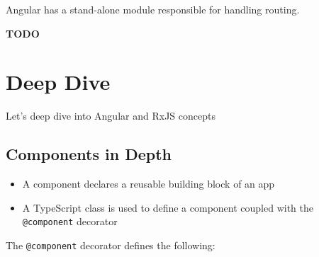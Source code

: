 \documentclass[12pt,]{article}
\providecommand{\tightlist}{%
  \setlength{\itemsep}{0pt}\setlength{\parskip}{0pt}}
\begin{document}
Angular has a stand-alone module responsible for handling routing.

\textbf{TODO}

\section{Deep Dive}\label{deep-dive}

Let's deep dive into Angular and RxJS concepts

\subsection{Components in Depth}\label{components-in-depth}

\begin{itemize}
\tightlist
\item
  A component declares a reusable building block of an app
\item
  A TypeScript class is used to define a component coupled with the
  \texttt{@component} decorator
\end{itemize}

The \texttt{@component} decorator defines the following:
\end{document}
